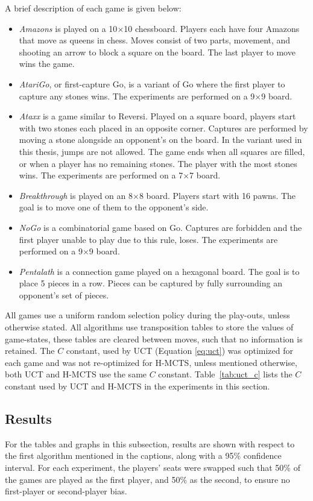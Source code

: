 \documentclass{icga}
\begin{document}
A brief description of each game is given below:
\begin{itemize}
\item \emph{Amazons} is played on a 10$\times$10 chessboard. Players each have four Amazons that move as queens in chess. Moves consist of two parts, movement, and shooting an arrow to block a square on the board. The last player to move wins the game.
\item \emph{AtariGo}, or first-capture Go, is a variant of Go where the first player to capture any stones wins. The experiments are performed on a 9$\times$9 board.
\item \emph{Ataxx} is a game similar to Reversi. Played on a square board, players start with two stones each placed in an opposite corner. Captures are performed by moving a stone alongside an opponent's on the board. In the variant used in this thesis, jumps are not allowed. The game ends when all squares are filled, or when a player has no remaining stones. The player with the most stones wins.  The experiments are performed on a 7$\times$7 board.
\item \emph{Breakthrough} is played on an 8$\times$8 board. Players start with 16 pawns. The goal is to move one of them to the opponent's side.
\item \emph{NoGo} is a combinatorial game based on Go. Captures are forbidden and the first player unable to play due to this rule, loses. The experiments are performed on a 9$\times$9 board.
\item \emph{Pentalath} is a connection game played on a hexagonal board. The goal is to place 5 pieces in a row. Pieces can be captured by fully surrounding an opponent's set of pieces.
\end{itemize}

All games use a uniform random selection policy during the play-outs, unless otherwise stated. All algorithms use transposition tables to store the values of game-states, these tables are cleared between moves, such that no information is retained. The $C$ constant, used by UCT (Equation \ref{eq:uct}) was optimized for each game and was not re-optimized for H-MCTS, unless mentioned otherwise, both UCT and H-MCTS use the same $C$ constant. Table~\ref{tab:uct_c} lists the $C$ constant used by UCT and H-MCTS in the experiments in this section.

\subsection{Results}
\label{subsec:results}
For the tables and graphs in this subsection, results are shown with respect to the first algorithm mentioned in the captions, along with a 95\% confidence interval. For each experiment, the players' seats were swapped such that 50\% of the games are played as the first player, and 50\% as the second, to ensure no first-player or second-player bias.
\end{document}
